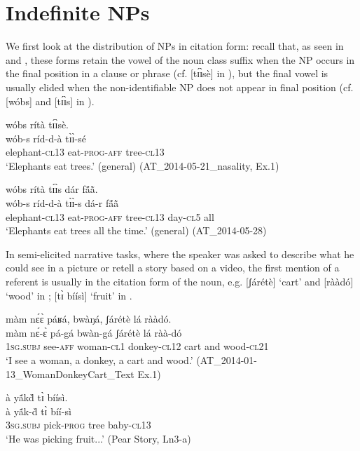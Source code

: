 \documentclass[output=paper]{langsci/langscibook}
\begin{document}
\section{Indefinite NPs}\label{sec:teo:5}

We first look at the distribution of NPs in citation form: recall that, as seen in  and , these forms retain the vowel of the noun class suffix when the NP occurs in the final position in a clause or phrase (cf. [t\'ɪ\`ɪsè] in ), but the final vowel is usually elided when the non-identifiable NP does not appear in final position (cf. [wóbs] and [t\'ɪ\`ɪs] in ).

\ea\label{ex:teo:26}
\glll wóbs rítà t\'ɪ\`ɪsè.\\
 wób-s ríd-d-à t\`ɪ\`ɪ-sé\\
elephant-\textsc{cl13} eat-\textsc{prog-aff} tree-\textsc{cl13}\\
\glt ‘Elephants eat trees.’ (general) (AT\_2014-05-21\_nasality, Ex.1)
\z

\ea\label{ex:teo:27}
\glll wóbs rítà t\'ɪ\`ɪs dár f\'{ã}\`{ã}.\\
 wób-s ríd-d-à t\`ɪ\`ɪ-s dá-r f\'{ã}\`{ã}\\
elephant-\textsc{cl13} eat-\textsc{prog-aff} tree-\textsc{cl13} day-\textsc{cl5} all\\
\glt ‘Elephants eat trees all the time.’ (general) (AT\_2014-05-28)
\z

In semi-elicited narrative tasks, where the speaker was asked to describe what he could see in a picture or retell a story based on a video, the first mention of a referent is usually in the citation form of the noun, e.g. [ʃárétè] ‘cart’ and [rààdó] ‘wood’ in ; [t\`ɪ bíísì] ‘fruit’ in .

\ea\label{ex:teo:28}
\glll màm n\'ɛ\`ɛ páʁá, bwàŋá, ʃárétè lá rààdó.\\
 màm n\'ɛ-\`ɛ pá-gá bwàn-gá ʃárétè lá ràà-dó\\
1\textsc{sg.subj} see-\textsc{aff} woman-\textsc{cl1} donkey-\textsc{cl12} cart and wood-\textsc{cl21}\\
\glt ‘I see a woman, a donkey, a cart and wood.’ (AT\_2014-01-13\_WomanDonkeyCart\_Text Ex.1)
\z

\ea\label{ex:teo:29}
\glll à y\'{ã}k\`{d} t\`ɪ bíísì.\\
 à y\'{ã}k-\`{d}{\rmfnm} t\`ɪ bíí-sì\\
3\textsc{sg.subj} pick-\textsc{prog} tree baby-\textsc{cl13}\\
\glt ‘He was picking fruit...’ (Pear Story, Ln3-a)
\z
\end{document}
